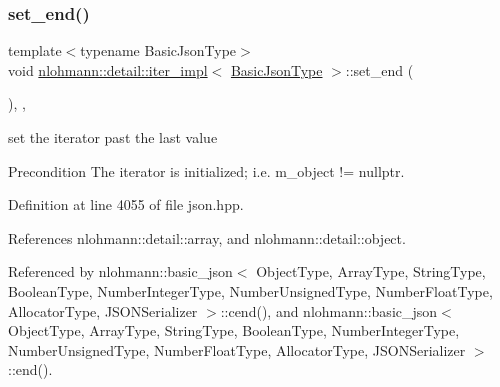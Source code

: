 \subsubsection{\texorpdfstring{set\+\_\+end()}{set\_end()}}
{\footnotesize\ttfamily template$<$typename Basic\+Json\+Type$>$ \\
void \hyperlink{classnlohmann_1_1detail_1_1iter__impl}{nlohmann\+::detail\+::iter\+\_\+impl}$<$ \hyperlink{classnlohmann_1_1detail_1_1iter__impl_abf18f18793f84b0222aebb5a2a87da7a}{Basic\+Json\+Type} $>$\+::set\+\_\+end (\begin{DoxyParamCaption}{ }\end{DoxyParamCaption})\hspace{0.3cm}{\ttfamily [inline]}, {\ttfamily [private]}, {\ttfamily [noexcept]}}



set the iterator past the last value 

\begin{DoxyPrecond}{Precondition}
The iterator is initialized; i.\+e. {\ttfamily m\+\_\+object != nullptr}. 
\end{DoxyPrecond}


Definition at line 4055 of file json.\+hpp.



References nlohmann\+::detail\+::array, and nlohmann\+::detail\+::object.



Referenced by nlohmann\+::basic\+\_\+json$<$ Object\+Type, Array\+Type, String\+Type, Boolean\+Type, Number\+Integer\+Type, Number\+Unsigned\+Type, Number\+Float\+Type, Allocator\+Type, J\+S\+O\+N\+Serializer $>$\+::cend(), and nlohmann\+::basic\+\_\+json$<$ Object\+Type, Array\+Type, String\+Type, Boolean\+Type, Number\+Integer\+Type, Number\+Unsigned\+Type, Number\+Float\+Type, Allocator\+Type, J\+S\+O\+N\+Serializer $>$\+::end().


